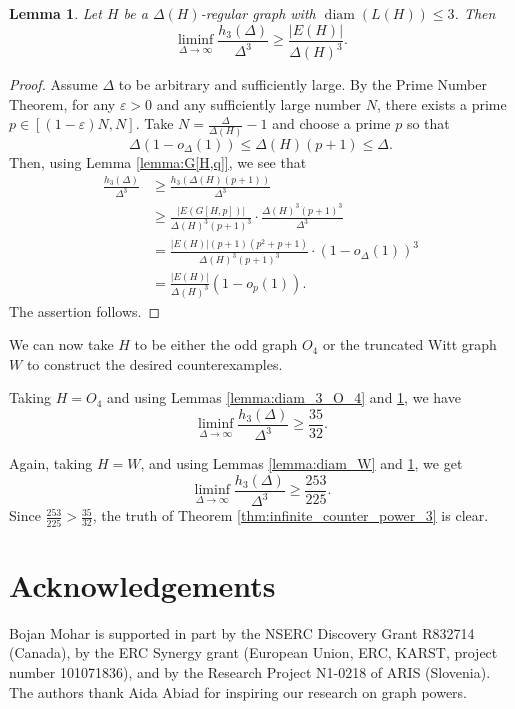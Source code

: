 \documentclass[11pt]{article}
\theoremstyle{plain}
\newtheorem{lemma}[theorem]{Lemma}
\numberwithin{equation}{section}
\DeclareMathOperator{\diam}{diam}
\begin{document}
\begin{lemma}\label{lemma:h_3_lower_bound}
    Let $H$ be a $\Delta(H)$-regular graph with $\diam(L(H))\le 3$. Then 
    \[ \liminf_{\Delta \to \infty} \frac{h_3(\Delta)}{\Delta^3}\ge \frac{|E(H)|}{\Delta(H)^3}.\]
\end{lemma}

\begin{proof}
Assume $\Delta$ to be arbitrary and sufficiently large. By the Prime Number Theorem, for any $\varepsilon > 0$ and any sufficiently large number $N$, there exists a prime $p\in [(1-\varepsilon)N, N]$. Take $N = \frac{\Delta}{\Delta(H)}-1$ and choose a prime $p$ so that
\[ \Delta(1-o_{\Delta}(1)) \le \Delta(H)(p+1) \le \Delta. \]
Then, using Lemma \ref{lemma:G[H,q]}, we see that
\begin{align*}
    \frac{h_3(\Delta)}{\Delta^3} & \ge \frac{h_3(\Delta(H)(p+1))}{\Delta^3}\\
    &\ge \frac{|E(G[H,p])|}{\Delta(H)^3(p+1)^3}\cdot \frac{\Delta(H)^3(p+1)^3}{\Delta^3} \\
    & = \frac{|E(H)|(p+1)(p^2+p+1)}{\Delta(H)^3(p+1)^3}\cdot (1-o_\Delta(1))^3 \\
    & = \frac{|E(H)|}{\Delta(H)^3}(1-o_p(1)).
\end{align*}
The assertion follows. 
\end{proof}

We can now take $H$ to be either the odd graph $O_4$ or the truncated Witt graph $W$ to construct the desired counterexamples. 

Taking $H = O_4$ and using Lemmas \ref{lemma:diam_3_O_4} and \ref{lemma:h_3_lower_bound}, we have 
\[ \liminf_{\Delta\to\infty}\frac{h_3(\Delta)}{\Delta^3}\ge \frac{35}{32}.\]

Again, taking $H=W$, and using Lemmas \ref{lemma:diam_W} and \ref{lemma:h_3_lower_bound}, we get 
\[
\liminf_{\Delta\to\infty}\frac{h_3(\Delta)}{\Delta^3}\ge \frac{253}{225}.
\]
Since $\frac{253}{225}>\frac{35}{32}$, the truth of Theorem \ref{thm:infinite_counter_power_3} is clear.

\section*{Acknowledgements}
Bojan Mohar is supported in part by the NSERC Discovery Grant R832714 (Canada), by the ERC Synergy grant (European Union, ERC, KARST, project number 101071836), and by the Research Project N1-0218 of ARIS (Slovenia). The authors thank Aida Abiad for inspiring our research on graph powers.
\end{document}
